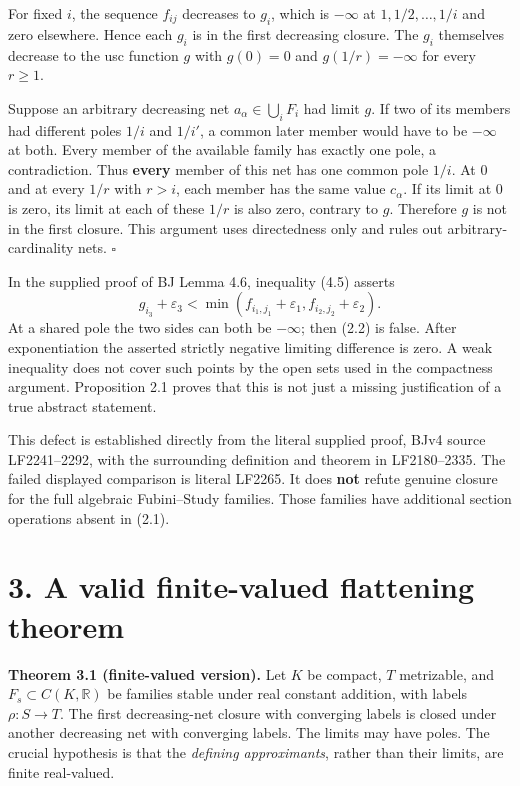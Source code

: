 \documentclass[10pt]{article}
\begin{document}
For fixed \(i\), the sequence \(f_{ij}\) decreases to \(g_i\), which is
\(-\infty\) at \(1,1/2,\ldots,1/i\) and zero elsewhere. Hence each
\(g_i\) is in the first decreasing closure. The \(g_i\) themselves
decrease to the usc function \(g\) with \(g(0)=0\) and
\(g(1/r)=-\infty\) for every \(r\geq1\).

Suppose an arbitrary decreasing net \(a_\alpha\in\bigcup_i F_i\) had
limit \(g\). If two of its members had different poles \(1/i\) and
\(1/i'\), a common later member would have to be \(-\infty\) at both.
Every member of the available family has exactly one pole, a
contradiction. Thus \textbf{every} member of this net has one common
pole \(1/i\). At 0 and at every \(1/r\) with \(r>i\), each member has
the same value \(c_\alpha\). If its limit at 0 is zero, its limit at
each of these \(1/r\) is also zero, contrary to \(g\). Therefore \(g\)
is not in the first closure. This argument uses directedness only and
rules out arbitrary-cardinality nets. \(\square\)

In the supplied proof of BJ Lemma 4.6, inequality (4.5) asserts \[
 g_{i_3}+\varepsilon_3<
 \min(f_{i_1,j_1}+\varepsilon_1,f_{i_2,j_2}+\varepsilon_2).
 \tag{2.2}
\] At a shared pole the two sides can both be \(-\infty\); then (2.2) is
false. After exponentiation the asserted strictly negative limiting
difference is zero. A weak inequality does not cover such points by the
open sets used in the compactness argument. Proposition 2.1 proves that
this is not just a missing justification of a true abstract statement.

This defect is established directly from the literal supplied proof,
BJv4 source LF2241--2292, with the surrounding definition and theorem in
LF2180--2335. The failed displayed comparison is literal LF2265. It does
\textbf{not} refute genuine closure for the full algebraic Fubini--Study
families. Those families have additional section operations absent in
(2.1).

\section{3. A valid finite-valued flattening
theorem}\label{a-valid-finite-valued-flattening-theorem}

\textbf{Theorem 3.1 (finite-valued version).} Let \(K\) be compact,
\(T\) metrizable, and \(F_s\subset C(K,\mathbb R)\) be families stable
under real constant addition, with labels \(\rho:S\to T\). The first
decreasing-net closure with converging labels is closed under another
decreasing net with converging labels. The limits may have poles. The
crucial hypothesis is that the \emph{defining approximants}, rather than
their limits, are finite real-valued.
\end{document}
